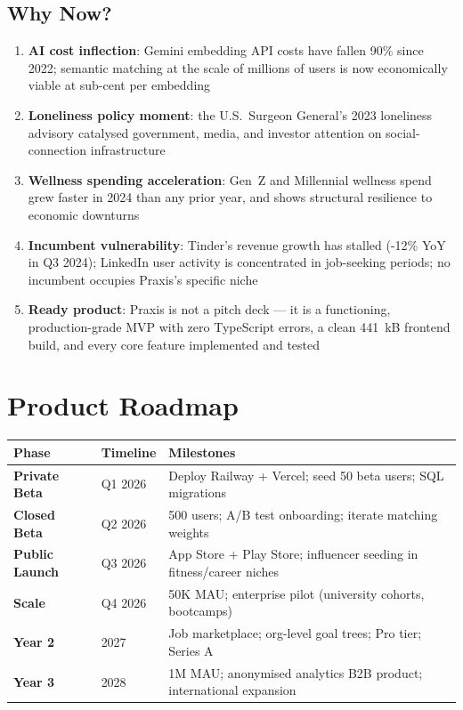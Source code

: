 \documentclass[11pt,a4paper]{article}
\begin{document}
\subsection{Why Now?}

\begin{enumerate}
  \item \textbf{AI cost inflection}: Gemini embedding API costs have fallen 90\% since 2022; semantic matching at the scale of millions of users is now economically viable at sub-cent per embedding
  \item \textbf{Loneliness policy moment}: the U.S.\ Surgeon General's 2023 loneliness advisory catalysed government, media, and investor attention on social-connection infrastructure
  \item \textbf{Wellness spending acceleration}: Gen~Z and Millennial wellness spend grew faster in 2024 than any prior year, and shows structural resilience to economic downturns
  \item \textbf{Incumbent vulnerability}: Tinder's revenue growth has stalled (-12\% YoY in Q3 2024); LinkedIn user activity is concentrated in job-seeking periods; no incumbent occupies Praxis's specific niche
  \item \textbf{Ready product}: Praxis is not a pitch deck — it is a functioning, production-grade MVP with zero TypeScript errors, a clean 441~kB frontend build, and every core feature implemented and tested
\end{enumerate}

\section{Product Roadmap}

\begin{center}
\begin{tabular}{lll}
\toprule
\textbf{Phase} & \textbf{Timeline} & \textbf{Milestones} \\
\midrule
\textbf{Private Beta} & Q1 2026 & Deploy Railway + Vercel; seed 50 beta users; SQL migrations \\
\textbf{Closed Beta} & Q2 2026 & 500 users; A/B test onboarding; iterate matching weights \\
\textbf{Public Launch} & Q3 2026 & App Store + Play Store; influencer seeding in fitness/career niches \\
\textbf{Scale} & Q4 2026 & 50K MAU; enterprise pilot (university cohorts, bootcamps) \\
\textbf{Year 2} & 2027 & Job marketplace; org-level goal trees; Pro tier; Series A \\
\textbf{Year 3} & 2028 & 1M MAU; anonymised analytics B2B product; international expansion \\
\bottomrule
\end{tabular}
\end{center}
\end{document}
